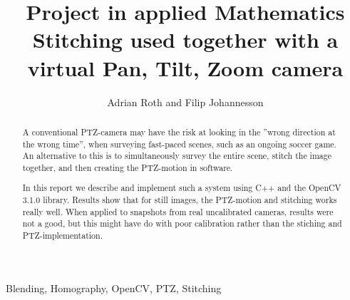 \documentclass[10 pt, journal]{IEEEtran}
\title{Project in applied Mathematics \\
  \large Stitching used together with a virtual Pan, Tilt, Zoom camera}
\author{Adrian Roth and Filip Johannesson}
\begin{document}
\maketitle
\begin{abstract}
	A conventional PTZ-camera may have the risk at looking in the ''wrong direction at the wrong time'', when surveying fast-paced scenes, such as an ongoing soccer game. An alternative to this is to simultaneously survey the entire scene, stitch the image together, and then creating the PTZ-motion in software.

	In this report we describe and implement such a system using C++ and the OpenCV 3.1.0 library. Results show that for still images, the PTZ-motion and stitching works really well. 
	When applied to snapshots from real uncalibrated cameras, results were not a good, but this might have do with poor calibration rather than the stiching and PTZ-implementation.
\end{abstract}
\begin{IEEEkeywords}
	Blending, Homography, OpenCV, PTZ, Stitching 
\end{IEEEkeywords}













\newpage


\end{document}
